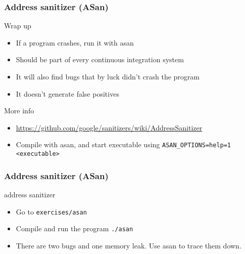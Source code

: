 \begin{frame}[fragile]
  \frametitle{Address sanitizer (ASan)}
  \begin{block}{Wrap up}
    \begin{itemize}
      \item If a program crashes, run it with asan
      \item Should be part of every \cpp{} continuous integration system
      \item It will also find bugs that by luck didn't crash the program
      \item It doesn't generate false positives
    \end{itemize}
  \end{block}

  \begin{exampleblock}{More info}
    \begin{itemize}
      \item \url{https://github.com/google/sanitizers/wiki/AddressSanitizer}
      \item Compile with asan, and start executable using \texttt{ASAN_OPTIONS=help=1 <executable>}
    \end{itemize}
  \end{exampleblock}
\end{frame}

\begin{frame}[fragile]
  \frametitle{Address sanitizer (ASan)}
  \begin{exercise}{address sanitizer}
    \begin{itemize}
      \item Go to \texttt{exercises/asan}
      \item Compile and run the program \texttt{./asan}
      \item There are two bugs and one memory leak. Use asan to trace them down.
    \end{itemize}
  \end{exercise}

\end{frame}

